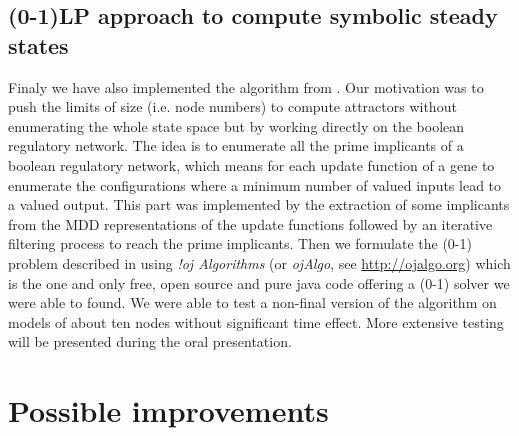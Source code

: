 \documentclass[a4paper,11pt]{article}
\begin{document}
\subsection{(0-1)LP approach to compute symbolic steady states}
Finaly we have also implemented the algorithm from \cite{Klarner}. Our
motivation was to push the limits of size (i.e. node numbers) to compute
attractors without enumerating the whole state space but by working directly on
the boolean regulatory network. The idea is to enumerate all the prime
implicants of a boolean regulatory network, which means for each update function
of a gene to enumerate the configurations where a minimum number of valued
inputs lead to a valued output. This part was implemented by the extraction of
some implicants from the MDD representations of the update functions followed by
an iterative filtering process to reach the prime implicants. Then we formulate
the (0-1) problem described in \cite{Klarner} using \emph{!oj Algorithms}
(or \emph{ojAlgo}, see \href{http://ojalgo.org}{http://ojalgo.org}) which is the
one and only free, open source and pure java code offering a (0-1) solver we
were able to found. We were able to test a non-final version of the algorithm on
models of about ten nodes without significant time effect. More extensive
testing will be presented during the oral presentation.


\section{Possible improvements}
\end{document}
